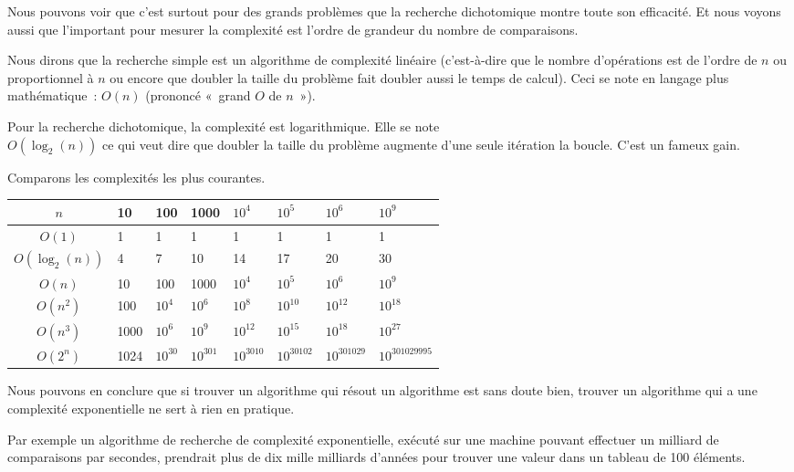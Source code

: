 			Nous pouvons voir que c’est surtout pour des grands problèmes que la
			recherche dichotomique montre toute son efficacité.  Et nous voyons
			aussi que l'important pour mesurer la complexité est l’ordre de
			grandeur du nombre de comparaisons. 
		
			Nous dirons que la recherche simple est un algorithme de complexité
			linéaire (c’est-à-dire que le nombre d’opérations est de l’ordre de
			$n$ ou proportionnel à $n$ ou encore que doubler la taille du
			problème fait doubler aussi le temps de calcul). Ceci se note en
			langage plus mathématique~: \textbf{$O(n)$} (prononcé «~grand $O$ de
			$n$~»). 
			
			Pour la recherche dichotomique, la complexité est logarithmique.
			Elle se note \\$O(\log_2(n))$ ce qui veut dire que doubler la taille
			du problème augmente d'une seule itération la boucle. C'est un
			fameux gain. 
			
			Comparons les complexités les plus courantes.
			\begin{center}
			\small
			\begin{tabular}{|c|l|l|l|l|l|l|l|}
			\hline
			\rowcolor{black!40}
			$n$ & 10 & 100 & 1000 & $10^4$ & $10^5$ & $10^6$ & $10^9$ \\
			\hline
			$O(1)$ & 1 & 1 & 1 & 1 & 1 & 1 & 1\\
			\hline
			$O(\log_2(n))$ & 4 & 7 & 10 & 14 & 17 & 20 & 30\\
			\hline
			$O(n)$ & 10 & 100 & 1000 & $10^4$ & $10^5$ & $10^6$ & $10^9$ \\
			\hline
			$O(n^2)$ & 100 & $10^4$ & $10^6$ & $10^8$ & $10^10$ & $10^{12}$ & $10^{18}$ \\
			\hline
			$O(n^3)$ & 1000 & $10^6$ & $10^9$ & $10^{12}$ & $10^{15}$ & $10^{18}$ & $10^{27}$ \\
			\hline
			$O(2^n)$ & 1024 & $10^{30}$ & $10^{301}$ & $10^{3010}$ & $10^{30102}$ 
			& $10^{301029}$ & {\tiny $10^{301029995}$} \\
			\hline
			\end{tabular}
			\end{center}
		
			Nous pouvons en conclure que si trouver un algorithme qui résout un
			algorithme est sans doute bien, trouver un algorithme qui a une
			complexité exponentielle ne sert à rien en pratique. 

			Par exemple un algorithme de recherche de complexité exponentielle,
			exécuté sur une machine pouvant effectuer un milliard de
			comparaisons par secondes, prendrait plus de dix mille milliards
			d’années pour trouver une valeur dans un tableau de 100 éléments.
